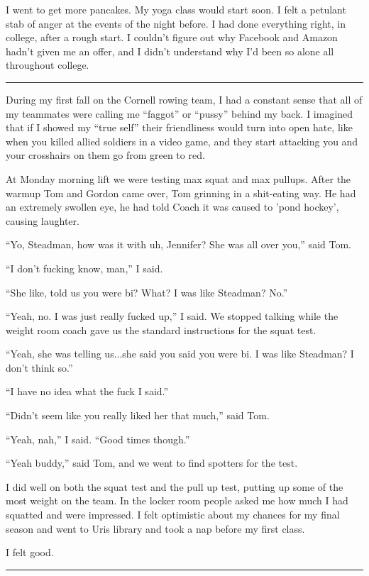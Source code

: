 I went to get more pancakes.  My yoga class would start soon.  I felt a petulant
stab of anger at the events of the night before.  I had done everything right,
in college, after a rough start.  I couldn't figure out why Facebook and Amazon
hadn't given me an offer, and I didn't understand why I'd been so alone all
throughout college. 

\plainfancybreak{12pt}{2}{* * *}

During my first fall on the Cornell rowing team, I had a constant sense that all
of my teammates were calling me ``faggot'' or ``pussy'' behind my back.  I
imagined that if I showed my ``true self'' their friendliness would turn into
open hate, like when you killed allied soldiers in a video game, and they start
attacking you and your crosshairs on them go from green to red. 

At Monday morning lift we were testing max squat and max pullups.  After the
warmup Tom and Gordon came over, Tom grinning in a shit-eating way.  He had an
extremely swollen eye, he had told Coach it was caused to 'pond hockey', causing
laughter.

``Yo, Steadman, how was it with uh, Jennifer?  She was all over you,'' said Tom.  

``I don't fucking know, man,'' I said.

``She like, told us you were bi?  What?  I was like Steadman?  No.''

``Yeah, no.  I was just really fucked up,'' I said.  We stopped talking while
the weight room coach gave us the standard instructions for the squat test.

``Yeah, she was telling us...she said you said you were bi.  I was like
Steadman?  I don't think so.''

``I have no idea what the fuck I said.''

``Didn't seem like you really liked her that much,'' said Tom.

``Yeah, nah,'' I said.  ``Good times though.''

``Yeah buddy,'' said Tom, and we went to find spotters for the test.

I did well on both the squat test and the pull up test, putting up some of the
most weight on the team.  In the locker room people asked me how much I had
squatted and were impressed.  I felt optimistic about my chances for my final
season and went to Uris library and took a nap before my first class.

I felt good.

\plainfancybreak{12pt}{2}{* * *}

